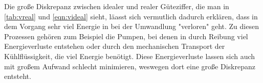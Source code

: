 Die große Diskrepanz zwischen idealer und realer Güteziffer, die man in \ref{tab:vreal} und \ref{eqn:videal} sieht,
läasst sich vermutlich dadurch erklären, dass in dem Vorgang sehr viel Energie in bei der Umwandlung
"verloren" geht.
Zu diesen Prozessen gehören zum Beispiel die Pumpen, bei denen in durch Reibung viel Energieverluste entstehen
oder durch den mechanischen Transport der Kühlflüssigkeit, die viel Energie benötigt.
Diese Energieverluste lassen sich auch mit großem Aufwand schlecht minimieren, weswegen dort eine große Diskrepanz entsteht.

